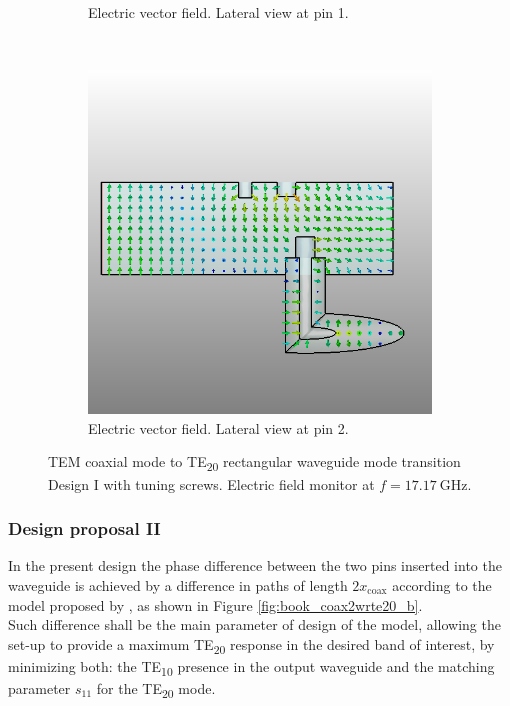 \documentclass[english,twoside]{article}
\begin{document}
\begin{landscape}
\begin{figure}
\begin{subfigure}[b]{0.4\textwidth}
					\caption{Electric vector field. Lateral view at pin 1.}
				\end{subfigure}
				~
				\begin{subfigure}[b]{0.4\textwidth}
					\includegraphics[width=\textwidth]{figures/coaxToWrTE20_screw_lateral2}
					\caption{Electric vector field. Lateral view at pin 2.}
				\end{subfigure}
				\caption{TEM coaxial mode to TE\textsubscript{20} rectangular waveguide mode transition Design I with tuning screws. Electric field monitor at $f=\SI{17.17}{\giga\hertz}$.}
			\end{figure}
		\end{landscape}
		
		\subsubsection{Design proposal II}
		
		In the present design the phase difference between the two pins inserted into the waveguide is achieved by a difference in paths of length $2 x_\mathrm{coax}$ according to the model proposed by \cite{montgomery}, as shown in Figure \ref{fig:book_coax2wrte20_b}.\\
		
		Such difference shall be the main parameter of design of the model, allowing the set-up to provide a maximum \ac{TE}\textsubscript{20} response in the desired band of interest, by minimizing both: the \ac{TE}\textsubscript{10} presence in the output waveguide and the matching parameter $s_{11}$ for the \ac{TE}\textsubscript{20} mode.\\
		
\end{document}
